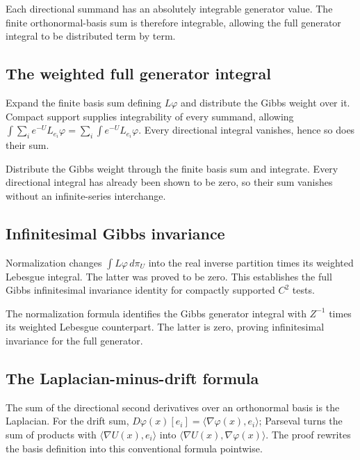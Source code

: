 \documentclass[11pt,a4paper]{report}
\begin{document}
Each directional summand has an absolutely integrable generator value. The finite orthonormal-basis sum is therefore integrable, allowing the full generator integral to be distributed term by term.

\subsection{\texorpdfstring{The weighted full generator integral}{The weighted full generator integral}}
\label{report-step-UnadjustedLangevin-Generator-lean-12}


Expand the finite basis sum defining \(L\varphi\) and distribute the Gibbs weight over it. Compact support supplies integrability of every summand, allowing \(\int\sum_i e^{-U}L_{e_i}\varphi=\sum_i\int e^{-U}L_{e_i}\varphi\). Every directional integral vanishes, hence so does their sum.



Distribute the Gibbs weight through the finite basis sum and integrate. Every directional integral has already been shown to be zero, so their sum vanishes without an infinite-series interchange.

\subsection{\texorpdfstring{Infinitesimal Gibbs invariance}{Infinitesimal Gibbs invariance}}
\label{report-step-UnadjustedLangevin-Generator-lean-13}


Normalization changes \(\int L\varphi\,d\pi_U\) into the real inverse partition times its weighted Lebesgue integral. The latter was proved to be zero. This establishes the full Gibbs infinitesimal invariance identity for compactly supported \(C^2\) tests.



The normalization formula identifies the Gibbs generator integral with \(Z^{-1}\) times its weighted Lebesgue counterpart. The latter is zero, proving infinitesimal invariance for the full generator.

\subsection{\texorpdfstring{The Laplacian-minus-drift formula}{The Laplacian-minus-drift formula}}
\label{report-step-UnadjustedLangevin-Generator-lean-14}


The sum of the directional second derivatives over an orthonormal basis is the Laplacian. For the drift sum, \(D\varphi(x)[e_i]=\langle\nabla\varphi(x),e_i\rangle\); Parseval turns the sum of products with \(\langle\nabla U(x),e_i\rangle\) into \(\langle\nabla U(x),\nabla\varphi(x)\rangle\). The proof rewrites the basis definition into this conventional formula pointwise.
\end{document}
